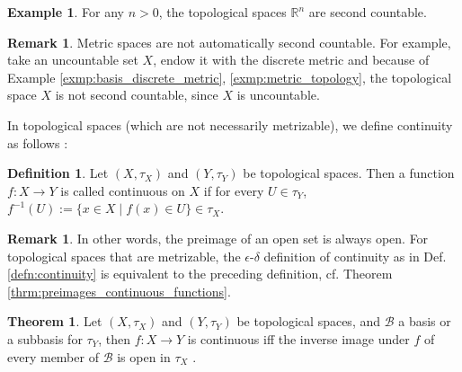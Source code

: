 \documentclass[12pt, a4paper]{article}
\numberwithin{equation}{section}
\theoremstyle{definition}
\theoremstyle{definition}
\newtheorem{defn}[thm]{Definition} %
\newtheorem{exmp}[thm]{Example} %
\newtheorem{remark}[thm]{Remark} %
\newtheorem{theorem}[thm]{Theorem}
\begin{document}
		\begin{exmp}
			For any $n > 0$, the topological spaces $\mathbb R^n$ are second countable. 
		\end{exmp}
		
		\begin{remark}
			Metric spaces are not automatically second countable. For example, take an uncountable set $X$, endow it with the discrete metric and because of Example \ref{exmp:basis_discrete_metric}, \ref{exmp:metric_topology},  the topological space $X$ is not second countable, since $X$ is uncountable. 
		\end{remark}	
	
		In topological spaces (which are not necessarily metrizable), we define continuity as follows \cite{topology-singh}:
		
		\begin{defn}\label{defn:continuity_topological_spaces}
			Let $(X, \tau_X)$ and $(Y, \tau_Y)$ be topological spaces. Then a function $f: X \to Y$ is called continuous on $X$ if for every $U\in \tau_Y$, $f^{-1}(U) := \{ x\in X \mid f(x)\in U \} \in \tau_X$.
		\end{defn}
		
		\begin{remark}
			In other words, the preimage of an open set is always open. For topological spaces that are metrizable, the $\epsilon$-$\delta$ definition of continuity as in Def. \ref{defn:continuity} is equivalent to the preceding definition, cf. Theorem \ref{thrm:preimages_continuous_functions}.
		\end{remark}
	
		\begin{theorem}\label{thrm:continuity_sub_basis}
			Let $(X, \tau_X)$ and $(Y, \tau_Y)$ be topological spaces, and $\mathscr B$ a basis or a subbasis for $\tau_Y$, then $f: X\to Y$ is continuous iff the inverse image under $f$ of every member of $\mathscr B$ is open in $\tau_X$ \cite{topology-singh}. 
		\end{theorem}
	
\end{document}
